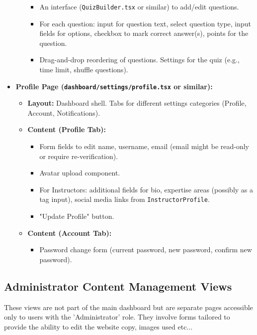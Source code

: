 \documentclass[12pt,a4paper]{article}
\begin{document}
\begin{itemize}
\begin{itemize}
\begin{itemize}
            \item An interface (\texttt{QuizBuilder.tsx} or similar) to add/edit questions.
            \item For each question: input for question text, select question type, input fields for options, checkbox to mark correct answer(s), points for the question.
            \item Drag-and-drop reordering of questions. Settings for the quiz (e.g., time limit, shuffle questions).
        \end{itemize}
    \end{itemize}
    \item \textbf{Profile Page (\texttt{dashboard/settings/profile.tsx} or similar):}
    \begin{itemize}
        \item \textbf{Layout:} Dashboard shell. Tabs for different settings categories (Profile, Account, Notifications).
        \item \textbf{Content (Profile Tab):}
        \begin{itemize}
            \item Form fields to edit name, username, email (email might be read-only or require re-verification).
            \item Avatar upload component.
            \item For Instructors: additional fields for bio, expertise areas (possibly as a tag input), social media links from \texttt{InstructorProfile}.
            \item "Update Profile" button.
        \end{itemize}
        \item \textbf{Content (Account Tab):}
        \begin{itemize}
            \item Password change form (current password, new password, confirm new password).
        \end{itemize}
    \end{itemize}
\end{itemize}

\subsection{Administrator Content Management Views}

These views are not part of the main dashboard but are separate pages accessible only to users with the 'Administrator' role. They involve forms tailored to provide the ability to edit the website copy, images used etc...
\end{document}
